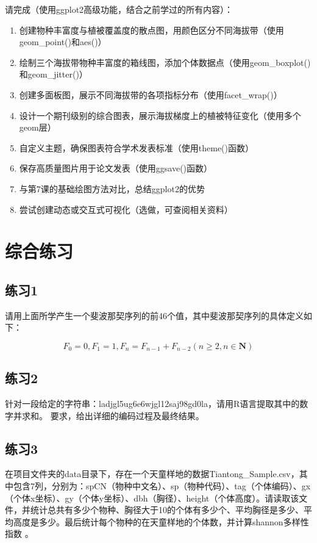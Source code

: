 \documentclass[
]{book}
\begin{document}
请完成（使用ggplot2高级功能，结合之前学过的所有内容）：

\begin{enumerate}
\def\labelenumi{\arabic{enumi}.}
\item
  创建物种丰富度与植被覆盖度的散点图，用颜色区分不同海拔带（使用geom\_point()和aes()）
\item
  绘制三个海拔带物种丰富度的箱线图，添加个体数据点（使用geom\_boxplot()和geom\_jitter()）
\item
  创建多面板图，展示不同海拔带的各项指标分布（使用facet\_wrap()）
\item
  设计一个期刊级别的综合图表，展示海拔梯度上的植被特征变化（使用多个geom层）
\item
  自定义主题，确保图表符合学术发表标准（使用theme()函数）
\item
  保存高质量图片用于论文发表（使用ggsave()函数）
\item
  与第7课的基础绘图方法对比，总结ggplot2的优势
\item
  尝试创建动态或交互式可视化（选做，可查阅相关资料）
\end{enumerate}

\hypertarget{ux7efcux5408ux7ec3ux4e60}{%
\section{综合练习}\label{ux7efcux5408ux7ec3ux4e60}}

\hypertarget{ux7ec3ux4e601}{%
\subsection{练习1}\label{ux7ec3ux4e601}}

请用上面所学产生一个斐波那契序列的前46个值，其中斐波那契序列的具体定义如下：

\[F_0=0, F_1=1, F_n=F_{n-1}+F_{n-2} (n \ge 2,n \in \mathbf{N})\]

\hypertarget{ux7ec3ux4e602}{%
\subsection{练习2}\label{ux7ec3ux4e602}}

针对一段给定的字符串：ladjgl5ug6e6wjgl12saj98gd0la，请用R语言提取其中的数字并求和。
要求，给出详细的编码过程及最终结果。

\hypertarget{ux7ec3ux4e603}{%
\subsection{练习3}\label{ux7ec3ux4e603}}

在项目文件夹的data目录下，存在一个天童样地的数据Tiantong\_Sample.csv，其中包含7列，分别为：spCN（物种中文名）、sp（物种代码）、tag（个体编码）、gx（个体x坐标）、gy（个体y坐标）、dbh（胸径）、height（个体高度）。请读取该文件，并统计总共有多少个物种、胸径大于10的个体有多少个、平均胸径是多少、平均高度是多少。最后统计每个物种的在天童样地的个体数，并计算shannon多样性指数 。

  
\end{document}
